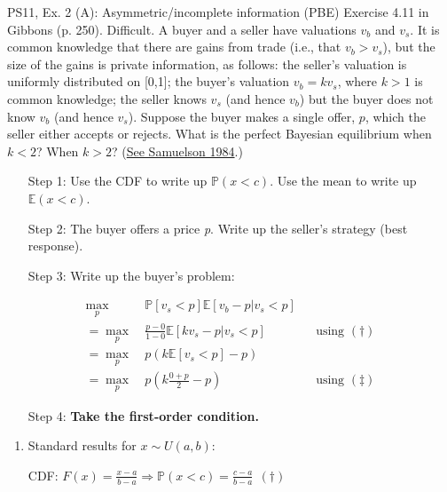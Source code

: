 \begin{frame}{PS11, Ex. 2 (A): Asymmetric/incomplete information (PBE)}
    Exercise 4.11 in Gibbons (p. 250). Difficult. A buyer and a seller have valuations $v_b$ and $v_s$. It is common knowledge that there are gains from trade (i.e., that $v_b > v_s$), but the size of the gains is private information, as follows: the seller’s valuation is uniformly distributed on [0,1]; the buyer’s valuation $v_b = kv_s$, where $k > 1$ is common knowledge; the seller knows $v_s$ (and hence $v_b$) but the buyer does not know $v_b$ (and hence $v_s$). Suppose the buyer makes a single offer, $p$, which the seller either accepts or rejects. What is the perfect Bayesian equilibrium when $k < 2$? When $k > 2$? (\href{https://www.jstor.org/stable/1911195}{See Samuelson 1984}.) \vspace{-8pt}
    \begin{multicols}{2}
      \begin{itemize}
        \item[Step 1:] Use the CDF to write up $\mathbb{P}(x<c)$. Use the mean to write up $\mathbb{E}(x<c)$.
        \item[Step 2:] The buyer offers a price \textit{p}. Write up the seller's strategy (best response).
        \item[Step 3:] Write up the buyer's problem:
      \end{itemize} \vspace{-8pt}
      \begin{align*}
         \displaystyle{\max_p}&\ \mathbb{P}[v_s<p]\mathbb{E}[v_b-p|v_s<p]\\
        =\displaystyle{\max_p}&\ \frac{p-0}{1-0}\mathbb{E}[kv_s-p|v_s<p]&&\text{using }(\dagger)\\
        =\displaystyle{\max_p}&\ p\left(k\mathbb{E}[v_s<p]-p\right)\\
        =\displaystyle{\max_p}&\ p\left(k\frac{0+p}{2}-p\right)&&\text{using }(\ddagger)
      \end{align*} \vspace{-8pt}
      \begin{itemize}
        \item[Step 4:] \textbf{Take the first-order condition.}
      \end{itemize}
      \vfill\null\columnbreak
      \begin{enumerate}
        \item Standard results for $x\sim U(a, b):$
        \item[CDF:] $F(x)=\frac{x-a}{b-a}\Rightarrow\mathbb{P}(x<c)=\frac{c-a}{b-a}\ \ (\dagger)$

\end{enumerate}
\end{multicols}
\end{frame}
